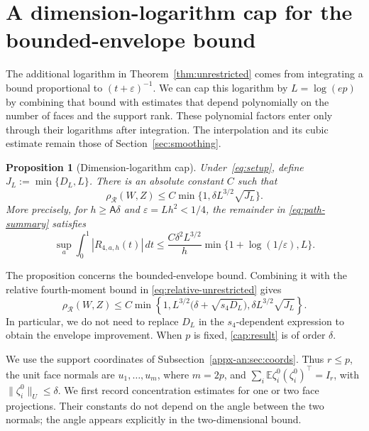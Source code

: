 \documentclass[11pt,letterpaper]{article}
\newtheorem{proposition}{Proposition}
\theoremstyle{remark}
\newcommand{\E}{\mathbb E}
\newcommand{\rh}{\rho_{\mathcal R}}
\begin{document}
\section{A dimension-logarithm cap for the bounded-envelope bound}
\label{app:dimension-cap}

The additional logarithm in Theorem~\ref{thm:unrestricted} comes from
integrating a bound proportional to \((t+\varepsilon)^{-1}\).
We can cap this logarithm by \(L=\log(ep)\) by combining that bound
with estimates that depend polynomially on the number of faces and
the support rank. These polynomial factors enter only through their
logarithms after integration. The interpolation and its cubic
estimate remain those of Section~\ref{sec:smoothing}.

\begin{proposition}[Dimension-logarithm cap]
\label{prop:dimension-cap}
Under~\eqref{eq:setup}, define \(J_L:=\min\{D_L,L\}\). There is an
absolute constant \(C\) such that
\begin{equation}
 \rh(W,Z)\le C\min\{1,\delta L^{3/2}\sqrt{J_L}\}.
 \label{cap:result}
\end{equation}
More precisely, for \(h\ge\mathsf A\delta\) and
\(\varepsilon=Lh^2<1/4\), the remainder in
\eqref{eq:path-summary} satisfies
\begin{equation}
 \sup_a\int_0^1|R_{4,a,h}(t)|\,dt
 \le\frac{C\delta^2L^{3/2}}h
       \min\{1+\log(1/\varepsilon),L\}.
 \label{cap:integrated}
\end{equation}
\end{proposition}

The proposition concerns the bounded-envelope bound. Combining it
with the relative fourth-moment bound in
\eqref{eq:relative-unrestricted} gives
\[
 \rh(W,Z)\le C\min\left\{1,
 L^{3/2}\bigl(\delta+\sqrt{s_4D_L}\bigr),
 \delta L^{3/2}\sqrt{J_L}\right\}.
\]
In particular, we do not need to replace \(D_L\) in the
\(s_4\)-dependent expression to obtain the envelope improvement.
When \(p\) is fixed, \eqref{cap:result} is of order \(\delta\).

We use the support coordinates of
Subsection~\ref{appx-an:sec:coords}. Thus \(r\le p\), the unit face
normals are \(u_1,\ldots,u_m\), where \(m=2p\), and
\(\sum_i\E\zeta_i^0(\zeta_i^0)^\top=I_r\), with
\(\|\zeta_i^0\|_U\le\delta\). We first record concentration
estimates for one or two face projections. Their constants do not
depend on the angle between the two normals; the angle appears
explicitly in the two-dimensional bound.
\end{document}
